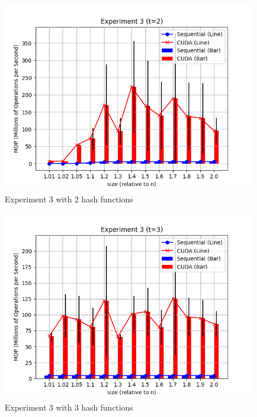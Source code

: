 \documentclass{article}
\begin{document}
\begin{figure}[h!]
    \centering
    \includegraphics[width=\textwidth]{../figs/experiment3_t2.png}
    \caption{Experiment 3 with 2 hash functions}
\end{figure}

\begin{figure}[h!]
    \centering
    \includegraphics[width=\textwidth]{../figs/experiment3_t3.png}
    \caption{Experiment 3 with 3 hash functions}
\end{figure}
\end{document}
